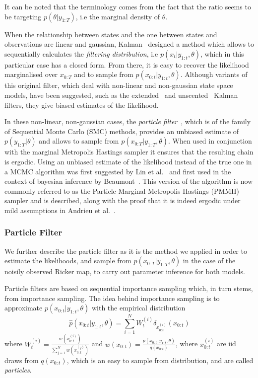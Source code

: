 \documentclass[12pt]{article}
\begin{document}
	It can be noted that the terminology comes from the fact that the ratio seems to be targeting $p(\theta | y_{1:T})$, i.e the marginal density of $\theta$.
	
 	When the relationship between states and the one between states and observations are linear and gaussian, Kalman~\cite{Kalman1960} designed a method which allows to sequentially calculates the \emph{filtering distribution}, i.e $p(x_{t}| y_{1:t}, \theta)$, which in this particular case has a closed form. From there, it is easy to recover the likelihood marginalised over $x_{0:T}$ and to sample from $p(x_{0:t}| y_{1:t}, \theta)$. Although variants of this original filter, which deal with non-linear and non-gaussian state space models, have been suggested, such as the extended~\cite{McElhoe1966} and unscented~\cite{Julier1997} Kalman filters, they give biased estimates of the likelihood. 
 	
 	In these non-linear, non-gaussian cases, the \emph{particle filter}~\cite{Gordon1993}, which is of the family of Sequential Monte Carlo (SMC) methods, provides an unbiased estimate of $p(y_{1:T}| \theta)$ and allows to sample from $p(x_{0:T}|y_{1:T}, \theta)$. When used in conjunction with the marginal Metropolis Hastings sampler it ensures that the resulting chain is ergodic. Using an unbiased estimate of the likelihood instead of the true one in a MCMC algorithm was first suggested by Lin et al.~\cite{lin2000noisy} and first used in the context of bayesian inference by Beaumont~\cite{beaumont2003estimation}. This version of the algorithm is now commonly referred to as the Particle Marginal Metropolis Hastings (PMMH) sampler and is described, along with the proof that it is indeed ergodic under mild assumptions in Andrieu et al.~\cite{andrieu2010particle}.
	
	\subsubsection{Particle Filter}
	We further describe the particle filter as it is the method we applied in order to estimate the likelihoods, and sample from $p(x_{0:T}|y_{1:T}, \theta)$ in the case of the noisily observed Ricker map, to carry out parameter inference for both models.
	
	Particle filters are based on sequential importance sampling which, in turn stems, from importance sampling.
	The idea behind importance sampling is to approximate $p(x_{0:t}|y_{1:t}, \theta)$ with the empirical distribution
	\begin{equation}
	\hat{p}(x_{0:t}|y_{1:t}, \theta) = \sum_{i=1}^{N}W_t^{(i)} \delta_{x_{0:t}^{(i)}}(x_{0:t})
	\end{equation}
	where $W_t^{(i)} = \frac{ w(x_{0:t}^{(i)})}{ \sum_{j=1}^{N} w(x_{0:t}^{(j)})}$ and $w(x_{0:t}) = \frac{ p(x_{0:t},y_{1:t}, \theta)}{ q(x_{0:t})}$, where $x_{0:t}^{(i)}$ are iid draws from $q(x_{0:t})$, which is an easy to sample from distribution, and are called \emph{particles}.
	
\end{document}

